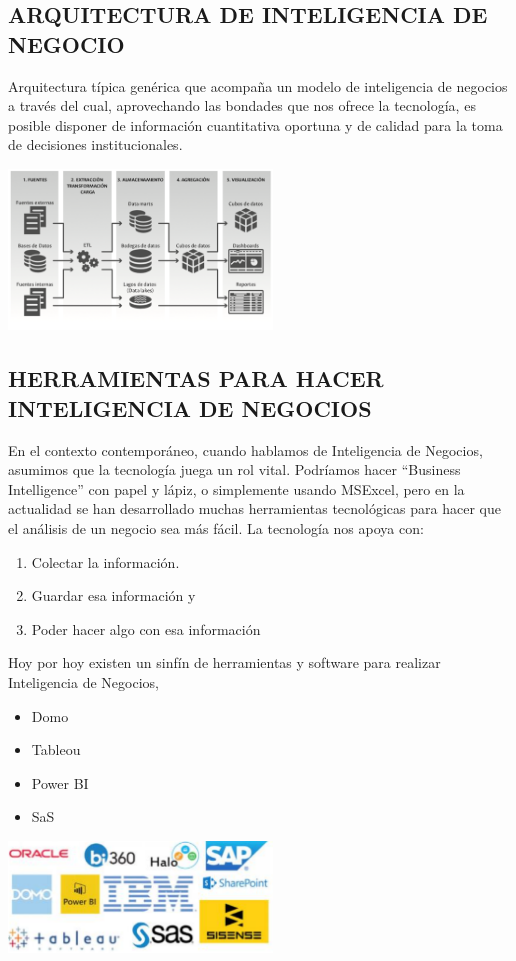 \documentclass[twoside,twocolumn]{article}
\begin{document}
\subsection{ARQUITECTURA DE INTELIGENCIA DE NEGOCIO}
Arquitectura típica genérica que acompaña un modelo de inteligencia de negocios a través del cual, aprovechando las bondades que nos ofrece la tecnología, es posible disponer de información cuantitativa oportuna y de calidad para la toma de decisiones institucionales.
\begin{center}
    \includegraphics[width=7cm]{./img/img1.png} 
\end{center}

\subsection{HERRAMIENTAS PARA HACER INTELIGENCIA DE NEGOCIOS}
En el contexto contemporáneo, cuando hablamos de Inteligencia de Negocios, asumimos que la tecnología juega un rol vital. Podríamos hacer “Business Intelligence” con papel y lápiz, o simplemente usando MSExcel, pero en la actualidad se han desarrollado muchas herramientas tecnológicas para hacer que el análisis de un negocio sea más fácil. La tecnología nos apoya con:
\begin{enumerate}
    \item Colectar la información. 
    \item Guardar esa información y 
    \item Poder hacer algo con esa información 
\end{enumerate}
Hoy por hoy existen un sinfín de herramientas y software para realizar Inteligencia de Negocios,
\begin{itemize}
    \item Domo
    \item Tableou
    \item Power BI
    \item SaS
\end{itemize}
\begin{center}
    \includegraphics[width=7cm]{./img/img2.png} 
\end{center}
\end{document}
